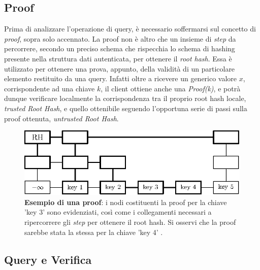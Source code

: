 	\subsection{Proof}
		

		Prima di analizzare l'operazione di query, è necessario soffermarsi sul concetto di \textit{proof}, sopra solo accennato. La proof non è altro che un insieme di \textit{step} da percorrere, secondo un preciso schema che rispecchia lo schema di hashing presente nella struttura dati autenticata, per ottenere il \textit{root hash}. Essa è utilizzato per ottenere una prova, appunto, della validità di un particolare elemento restituito da una query. Infatti oltre a ricevere un generico valore $ x $, corrispondente ad una chiave $ k $, il client ottiene anche una \textit{Proof(k)}, e potrà dunque verificare localmente la corrispondenza tra il proprio root hash locale, \textit{trusted Root Hash}, e quello ottenibile seguendo l'opportuna serie di passi sulla proof ottenuta, \textit{untrusted Root Hash}.
		
	\begin{figure}
		\centering
		\includegraphics[scale=0.8]{figure/proofExample.eps}
		\caption{\textbf{Esempio di una proof}: i nodi costituenti la proof per la chiave 'key 3' sono evidenziati, così come i collegamenti necessari a ripercorrere gli \textit{step} per ottenere il root hash. Si osservi che la proof sarebbe stata la stessa per la chiave 'key 4' .}\label{fig:9}
	\end{figure}
 		
	\subsection{Query e Verifica}
	
